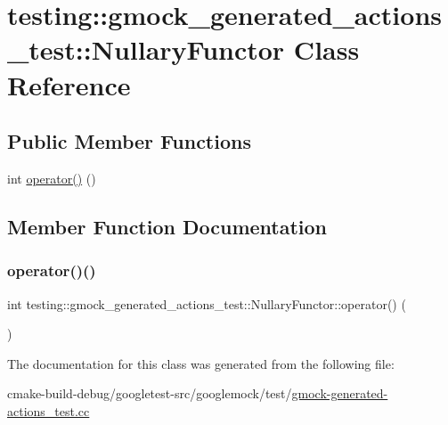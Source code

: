 \hypertarget{classtesting_1_1gmock__generated__actions__test_1_1NullaryFunctor}{}\section{testing\+::gmock\+\_\+generated\+\_\+actions\+\_\+test\+::Nullary\+Functor Class Reference}
\label{classtesting_1_1gmock__generated__actions__test_1_1NullaryFunctor}
\subsection*{Public Member Functions}
\begin{DoxyCompactItemize}
\item 
int \mbox{\hyperlink{classtesting_1_1gmock__generated__actions__test_1_1NullaryFunctor_afcf5ace9bbb5a2a91482688bdc20fa07}{operator()}} ()
\end{DoxyCompactItemize}


\subsection{Member Function Documentation}
\mbox{\label{classtesting_1_1gmock__generated__actions__test_1_1NullaryFunctor_afcf5ace9bbb5a2a91482688bdc20fa07}} 
\subsubsection{\texorpdfstring{operator()()}{operator()()}}
{\footnotesize\ttfamily int testing\+::gmock\+\_\+generated\+\_\+actions\+\_\+test\+::\+Nullary\+Functor\+::operator() (\begin{DoxyParamCaption}{ }\end{DoxyParamCaption})\hspace{0.3cm}{\ttfamily [inline]}}



The documentation for this class was generated from the following file\+:\begin{DoxyCompactItemize}
\item 
cmake-\/build-\/debug/googletest-\/src/googlemock/test/\mbox{\hyperlink{gmock-generated-actions__test_8cc}{gmock-\/generated-\/actions\+\_\+test.\+cc}}\end{DoxyCompactItemize}
